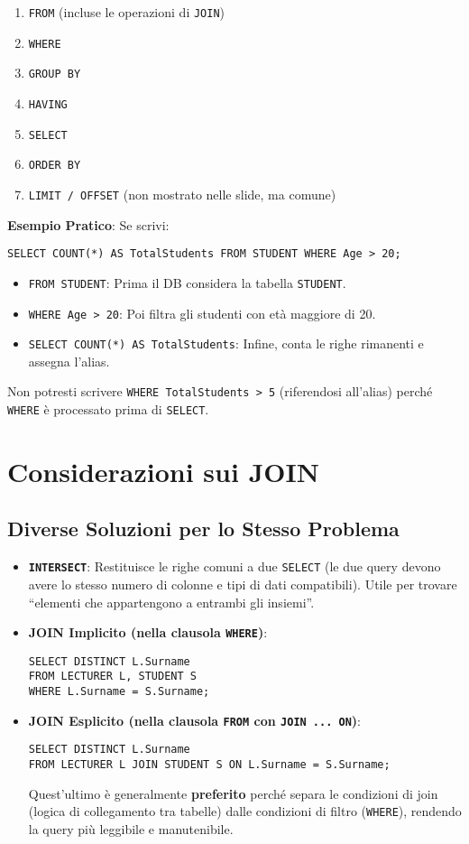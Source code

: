\begin{enumerate}
    \item \texttt{FROM} (incluse le operazioni di \texttt{JOIN})
    \item \texttt{WHERE}
    \item \texttt{GROUP BY}
    \item \texttt{HAVING}
    \item \texttt{SELECT}
    \item \texttt{ORDER BY}
    \item \texttt{LIMIT / OFFSET} (non mostrato nelle slide, ma comune)
\end{enumerate}

\textbf{Esempio Pratico}:
Se scrivi:
\begin{verbatim}
SELECT COUNT(*) AS TotalStudents FROM STUDENT WHERE Age > 20;
\end{verbatim}
\begin{itemize}
    \item \texttt{FROM STUDENT}: Prima il DB considera la tabella \texttt{STUDENT}.
    \item \texttt{WHERE Age > 20}: Poi filtra gli studenti con età maggiore di 20.
    \item \texttt{SELECT COUNT(*) AS TotalStudents}: Infine, conta le righe rimanenti e assegna l'alias.
\end{itemize}
Non potresti scrivere \texttt{WHERE TotalStudents > 5} (riferendosi all'alias) perché \texttt{WHERE} è processato prima di \texttt{SELECT}.

\section{Considerazioni sui JOIN}
\subsection{Diverse Soluzioni per lo Stesso Problema}
\begin{itemize}
    \item \textbf{\texttt{INTERSECT}}: Restituisce le righe comuni a due \texttt{SELECT} (le due query devono avere lo stesso numero di colonne e tipi di dati compatibili). Utile per trovare ``elementi che appartengono a entrambi gli insiemi''.
    \item \textbf{JOIN Implicito (nella clausola \texttt{WHERE})}:
    \begin{verbatim}
SELECT DISTINCT L.Surname
FROM LECTURER L, STUDENT S
WHERE L.Surname = S.Surname;
    \end{verbatim}
    \item \textbf{JOIN Esplicito (nella clausola \texttt{FROM} con \texttt{JOIN ... ON})}:
    \begin{verbatim}
SELECT DISTINCT L.Surname
FROM LECTURER L JOIN STUDENT S ON L.Surname = S.Surname;
    \end{verbatim}
    Quest'ultimo è generalmente \textbf{preferito} perché separa le condizioni di join (logica di collegamento tra tabelle) dalle condizioni di filtro (\texttt{WHERE}), rendendo la query più leggibile e manutenibile.
\end{itemize}

